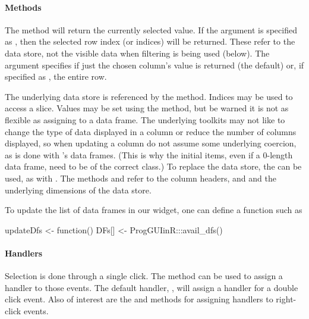 \paragraph{Methods}
The  method will return the currently selected
value. If the argument  is specified as , then
the selected row index (or indices) will be returned. These refer to
the data store, not the visible data when filtering is being used (below). The
argument  specifies if just the chosen column's value is
returned (the default) or, if specified as , the entire row.
 
The underlying data store is referenced by the \method{[}{gtable}
method. Indices may be used to access a slice. Values may be set using
the \method{[\ASSIGN}{gtable} method, but be warned it is not as
flexible as assigning to a data frame. The underlying toolkits may not
like to change the type of data displayed in a column or reduce the
number of columns displayed, so when updating a column do not assume
some underlying coercion, as is done with \R's data frames. (This is
why the initial items, even if a $0$-length data frame, need to be of
the correct class.) To replace the data store, the \code{[\ASSIGN} can
be used, as with . The methods
 and  refer to the
column headers, and  and 
the underlying dimensions of the data store.

To update the list of data frames in our  widget, one can define a function such as
\begin{Schunk}
\begin{Sinput}
 updateDfs <- function() {
   DFs[] <- ProgGUIinR:::avail_dfs()
 }
\end{Sinput}
\end{Schunk}


\paragraph{Handlers}
Selection is done through a single click. The 
method  can be used to assign a handler to those events. The default
handler, , will assign a
handler for a double click event. Also of interest are the
 and
 methods for assigning handlers
to right-click events.


